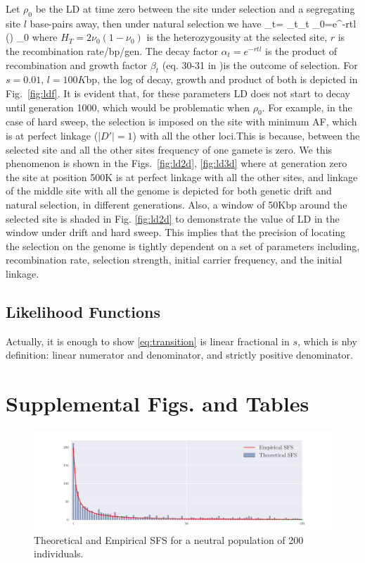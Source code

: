 \documentclass[11pt]{article}
\begin{document}
Let $\rho_0$ be the LD at time zero between the site under selection and a 
segregating site $l$ base-pairs away, then under natural selection we have
\beq
\rho_t= \alpha_t\beta_t \rho_0=e^{-rtl} \left(\right)  
\rho_0\label{eq:ldt}
\eeq
where $H_T=2\nu_0(1-\nu_0)$ is the heterozygousity at the selected site, $r$ is 
the recombination rate/bp/gen. The decay factor $\alpha_t=e^{-rtl}$ is the 
product of recombination and growth factor $\beta_t$ (eq. 30-31 in 
\cite{Stephan2006The})is the outcome of 
selection. For $s=0.01$, $l=100K$bp, the log of decay, growth and product of 
both is depicted in Fig.~\ref{fig:ldf}. It is evident that, for these 
parameters LD does not start to decay until generation 1000, which would be  
problematic when $\rho_0$. For example, in the case of hard sweep, the 
selection is imposed on the site with minimum AF, which is at perfect linkage 
($|D'|=1$) with all the other loci.This is because, between the 
	selected site and all the other sites frequency of one gamete is zero.
We this phenomenon is shown in the Figs.~\ref{fig:ld2d}, \ref{fig:ld3d} where 
at generation zero the site at position 500K is at perfect linkage with all the 
other sites, and linkage of the middle site with all the genome is depicted 
for both genetic drift and natural selection, in different generations.
Also, a window of 50Kbp around the selected site is shaded in Fig. 
\ref{fig:ld2d} to demonstrate the value of LD in the window under drift and 
hard sweep. This implies that the precision of locating the selection on the 
genome is tightly dependent on a set of parameters including, recombination 
rate, selection strength, initial carrier frequency, and the initial linkage.

\subsection{Likelihood Functions} \label{app:likelihood} Actually, it is
enough to show \eqref{eq:transition} is linear fractional in $s$,
which is nby definition: linear numerator and denominator, and
strictly positive denominator.  

\clearpage
\newpage
\section{Supplemental Figs. and Tables}

\begin{figure}[H]
	\centering
	\includegraphics[trim=1in 0.1in 1in 0.1in,clip,width=\textwidth]{figures/sfs.pdf}
	\caption{Theoretical and Empirical SFS for a neutral population of 200 
	individuals.}	\label{fig:sfs}
\end{figure}
\end{document}
